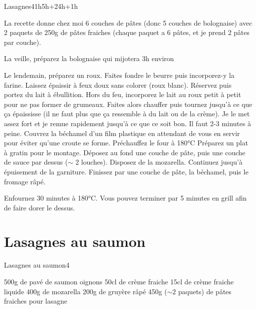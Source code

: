 {\begin{recette}{Lasagnes}{4}{1h}{5h+24h+1h}
\begin{remarque}
La recette donne chez moi 6 couches de pâtes (donc 5 couches de bolognaise) avec 2 paquets de 250g de pâtes fraiches (chaque paquet a 6 pâtes, et je prend 2 pâtes par couche). 
\end{remarque}

\begin{preparation}
\etape La veille, préparez la bolognaise qui mijotera 3h environ

\etape Le lendemain, préparez un roux. Faites fondre le beurre puis incorporez-y la farine. Laissez épaissir à feux doux sans colorer (roux blanc).
\etape Réservez puis portez du lait à ébullition.
\etape Hors du feu, incorporez le lait au roux petit à petit pour ne pas former de grumeaux. 
\etape Faites alors chauffer puis tournez jusqu'à ce que ça épaississe (il ne faut plus que ça ressemble à du lait ou de la crème). Je le met assez fort et je remue rapidement jusqu'à ce que ce soit bon. Il faut 2-3 minutes à peine. 
\etape Couvrez la béchamel d'un film plastique en attendant de vous en servir pour éviter qu'une croute se forme.
\etape Préchauffez le four à 180°C
\etape Préparez un plat à gratin pour le montage. Déposez au fond une couche de pâte, puis une couche de sauce par dessus ($\sim$ 2 louches). 
Disposez de la mozarella. Continuez jusqu'à épuisement de la garniture. 
\etape Finissez par une couche de pâte, la béchamel, puis le fromage râpé. 
\end{preparation}

\begin{cuisson}
Enfournez 30 minutes à 180°C. Vous pouvez terminer par 5 minutes en grill afin de faire dorer le dessus.

\end{cuisson}
\end{recette}

\section{Lasagnes au saumon}
\begin{recette}{Lasagnes au saumon}{4}{}{}
\begin{ingredients}
\ingredient 500g de pavé de saumon
 oignons
\ingredient 50cl de crème fraiche
\ingredient 15cl de crème fraiche liquide
\ingredient 400g de mozarella
\ingredient 200g de gruyère râpé
\ingredient 450g ($\sim 2$ paquets) de pâtes fraiches pour lasagne
\end{ingredients}


\end{recette}}
